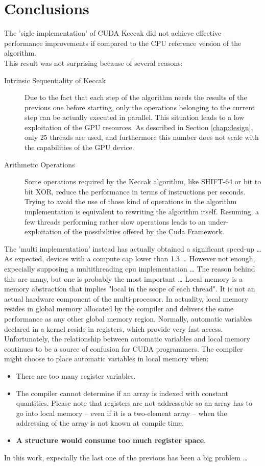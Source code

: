 \chapter{Conclusions} \label{chap:conclusions}
The 'sigle implementation' of CUDA Keccak did not achieve effective performance improvements if compared to the CPU reference version of the algorithm.\\
This result was not surprising because of several reasons:
\begin{description}
\item [Intrinsic Sequentiality of Keccak] Due to the fact that each step of the algorithm needs the results of the previous one before starting, only the operations belonging to the current step can be actually executed in parallel. This situation leads to a low exploitation of the GPU resources. As described in Section \ref{chap:design}, only 25 threads are used, and furthermore this number does not scale with the capabilities of the GPU device.
\item [Arithmetic Operations] Some operations required by the Keccak algorithm, like SHIFT-64 or bit to bit XOR, reduce the performance in terms of instructions per seconds. Trying to avoid the use of those kind of operations in the algorithm implementation is equivalent to rewriting the algorithm itself. Resuming, a few threads performing rather slow operations leads to an under-exploitation of the possibilities offered by the Cuda Framework.
\end{description}
The 'multi implementation' instead has actually obtained a significant speed-up \dots
As expected, devices with a compute cap lower than 1.3 \dots
However not enough, expecially supposing a multithreading cpu implementation \dots
The reason behind this are many, but one is probably the most important \dots
Local memory is a memory abstraction that implies "local in the scope of each thread". It is not an actual hardware component of the multi-processor. In actuality, local memory resides in global memory allocated by the compiler and delivers the same performance as any other global memory region. Normally, automatic variables declared in a kernel reside in registers, which provide very fast access. Unfortunately, the relationship between automatic variables and local memory continues to be a source of confusion for CUDA programmers. The compiler might choose to place automatic variables in local memory when:
\begin{itemize}
\item There are too many register variables.
\item The compiler cannot determine if an array is indexed with constant quantities. Please note that registers are not addressable so an array has to go into local memory -- even if it is a two-element array -- when the addressing of the array is not known at compile time.
\item \textbf{A structure would consume too much register space}.
\end{itemize}
In this work, expecially the last one of the previous has been a big problem \dots
